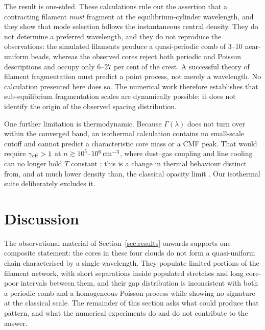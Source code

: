 \documentclass[usenatbib,twoside,twocolumn]{mnras}
\begin{document}
The result is one-sided. These calculations rule out the assertion that a contracting filament \emph{must} fragment at the equilibrium-cylinder wavelength, and they show that mode selection follows the instantaneous central density. They do not determine a preferred wavelength, and they do not reproduce the observations: the simulated filaments produce a quasi-periodic comb of 3--10 near-uniform beads, whereas the observed cores reject both periodic and Poisson descriptions and occupy only $6$--$27$ per cent of the crest. A successful theory of filament fragmentation must predict a point process, not merely a wavelength. No calculation presented here does so. The numerical work therefore establishes that sub-equilibrium fragmentation scales are dynamically possible; it does not identify the origin of the observed spacing distribution.

One further limitation is thermodynamic. Because $\Gamma(\lambda)$ does not turn over within the converged band, an isothermal calculation contains no small-scale cutoff and cannot predict a characteristic core mass or a CMF peak. That would require $\gamma_{\rm eff}>1$ at $n\gtrsim10^{5}$--$10^{6}\,{\rm cm^{-3}}$, where dust--gas coupling and line cooling can no longer hold $T$ constant \citep{Larson1985,Glover2012}; this is a change in thermal behaviour distinct from, and at much lower density than, the classical opacity limit \citep{Rees1976,LowLyndenBell1976}. Our isothermal suite deliberately excludes it.

\section{Discussion}

\noindent The observational material of Section~\ref{sec:results} onwards supports one composite statement: the cores in these four clouds do not form a quasi-uniform chain characterised by a single wavelength. They populate limited portions of the filament network, with short separations inside populated stretches and long core-poor intervals between them, and their gap distribution is inconsistent with both a periodic comb and a homogeneous Poisson process while showing no signature at the classical scale. The remainder of this section asks what could produce that pattern, and what the numerical experiments do and do not contribute to the answer.
\label{sec:discussion}
\end{document}
